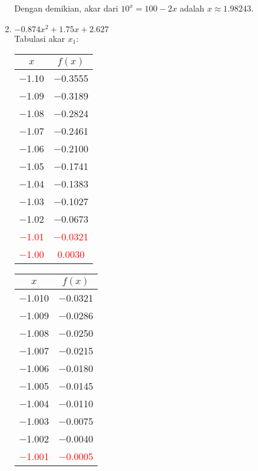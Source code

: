 \documentclass{article}
\begin{document}
\begin{enumerate}
\begin{enumerate}
        Dengan demikian, akar dari $10^x = 100 - 2x$ adalah $x \approx \num{1,98243}$.
    
        \item $\num{-0,874}x^2 + \num{1,75}x + \num{2,627}$ \\
        Tabulasi akar $x_1$:\\
        \begin{tabular}{|c|c|}
            \hline
            $x$   & $f(x)$ \\
            \hline
            \num{-1,10} & \num{-0,3555} \\
            \num{-1,09} & \num{-0,3189} \\
            \num{-1,08} & \num{-0,2824} \\
            \num{-1,07} & \num{-0,2461} \\
            \num{-1,06} & \num{-0,2100} \\
            \num{-1,05} & \num{-0,1741} \\
            \num{-1,04} & \num{-0,1383} \\
            \num{-1,03} & \num{-0,1027} \\
            \num{-1,02} & \num{-0,0673} \\
            \textcolor{red}{\num{-1,01}} & \textcolor{red}{\num{-0,0321}} \\
            \textcolor{red}{\num{-1,00}} & \textcolor{red}{\num{0,0030}} \\
            \hline
            \end{tabular}\quad
            \begin{tabular}{|c|c|}
            \hline
            $x$   & $f(x)$ \\
            \hline
            \num{-1,010} & \num{-0,0321} \\
            \num{-1,009} & \num{-0,0286} \\
            \num{-1,008} & \num{-0,0250} \\
            \num{-1,007} & \num{-0,0215} \\
            \num{-1,006} & \num{-0,0180} \\
            \num{-1,005} & \num{-0,0145} \\
            \num{-1,004} & \num{-0,0110} \\
            \num{-1,003} & \num{-0,0075} \\
            \num{-1,002} & \num{-0,0040} \\
            \textcolor{red}{\num{-1,001}} & \textcolor{red}{\num{-0,0005}} \\

\end{tabular}
\end{enumerate}
\end{enumerate}
\end{document}

